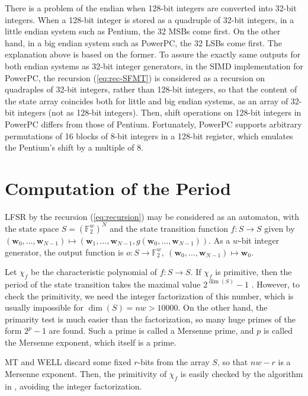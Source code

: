 \documentclass[acmnow]{acmtrans2m}
\def\F2{{\mathbb F}_2}
\def\bw{{{\mathbf w}}}
\begin{document}
There is a problem of the endian when 128-bit integers 
are converted into 32-bit integers. When a 128-bit integer
is stored as a quadruple of 32-bit integers, in a little
endian system such as Pentium, the 32 MSBs come first.
On the other hand, in a big endian system such as PowerPC,
the 32 LSBs come first. 
The explanation above is based on the former.
To assure the exactly same outputs for both endian systems
as 32-bit integer generators, in the SIMD implementation 
for PowerPC, 
the recursion (\ref{eq:rec-SFMT}) is considered as 
a recursion on quadraples of 32-bit integers, rather than
128-bit integers, so that the content of the state array 
coincides both for little and big endian systems,
as an array of 32-bit integers (not as 128-bit integers).
Then, shift operations on 128-bit integers
in PowerPC differs from those of Pentium. 
Fortunately, 
PowerPC supports arbitrary permutations of 
16 blocks of 8-bit integers in a 128-bit register,
which emulates the Pentium's shift by a multiple of 8.

\appendix
\section{Computation of the Period}\label{sec:period}
LFSR by the recursion (\ref{eq:recursion})
may be considered as an automaton, 
with the state space $S=(\F2^{w})^{N}$
and the state transition function 
$f: S \to S$ given by
$(\bw_0,\ldots,\bw_{N-1})
\mapsto (\bw_1,\ldots,\bw_{N-1}, g(\bw_0,\ldots,\bw_{N-1}))$.  
As a $w$-bit integer generator, the output function is 
$o: S \to \F2^{w},\  (\bw_0,\ldots,\bw_{N-1}) \mapsto \bw_0$.

Let $\chi_f$ be the characteristic polynomial of $f:S \to S$.
If $\chi_f$ is primitive, then the 
period of the state transition takes the maximal value
$2^{\dim(S)}-1$ \cite[\S3.2.2]{knuth:bible}. 
However, to check the primitivity, we need
the integer factorization of this number, which is usually 
impossible for $\dim(S)=nw>10000$. 
On the other hand, the primarity test is much easier than 
the factorization, so many huge primes of the form 
$2^p-1$ are found. 
Such a prime is called a Mersenne prime, and $p$ is
called the Mersenne exponent, which itself is a prime.

MT and WELL discard some fixed $r$-bits from the
array $S$, so that $nw-r$ is a Mersenne exponent. 
Then, the primitivity of $\chi_f$ is easily checked
by the algorithm in \cite[\S3.2.2]{knuth:bible},
avoiding the integer factorization.
\end{document}
